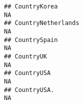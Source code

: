 \documentclass[]{article}
\begin{document}
\begin{verbatim}
## CountryKorea                                                                                                                                                                                                                                                                                                                                                                                                                                                                          NA
## CountryNetherlands                                                                                                                                                                                                                                                                                                                                                                                                                                                                    NA
## CountrySpain                                                                                                                                                                                                                                                                                                                                                                                                                                                                          NA
## CountryUK                                                                                                                                                                                                                                                                                                                                                                                                                                                                             NA
## CountryUSA                                                                                                                                                                                                                                                                                                                                                                                                                                                                            NA
## CountryUSA.                                                                                                                                                                                                                                                                                                                                                                                                                                                                           NA

\end{verbatim}
\end{document}
